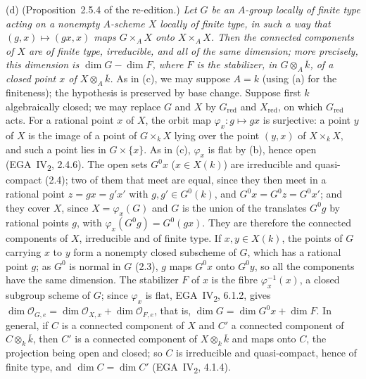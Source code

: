 \label{prop:sga3-VIA-2.5.4}%
(d) (Proposition~2.5.4 of the re-edition.) \emph{Let \(G\) be an \(A\)-group locally of finite type
acting on a nonempty \(A\)-scheme \(X\) locally of finite type, in such a way that
\((g,x)\mapsto(gx,x)\) maps \(G\times_AX\) onto \(X\times_AX\). Then the connected components of
\(X\) are of finite type, irreducible, and all of the same dimension;}
\label{concl:sga3-VIA-2.5.4-ii}%
\emph{more precisely, this dimension is \(\dim G-\dim F\), where \(F\) is the stabilizer, in
\(G\otimes_A\overline k\), of a closed point \(x\) of \(X\otimes_A\overline k\).} As in (c), we may
suppose \(A=k\) (using (a) for the finiteness); the hypothesis is preserved by base change. Suppose
first \(k\) algebraically closed; we may replace \(G\) and \(X\) by \(G_{\mathrm{red}}\) and
\(X_{\mathrm{red}}\), on which \(G_{\mathrm{red}}\) acts. For a rational point \(x\) of \(X\), the
orbit map \(\varphi_x\colon g\mapsto gx\) is surjective: a point \(y\) of \(X\) is the image of a
point of \(G\times_kX\) lying over the point \((y,x)\) of \(X\times_kX\), and such a point lies in
\(G\times\{x\}\). As in (c), \(\varphi_x\) is flat by (b), hence open
(EGA~IV\textsubscript{2}, 2.4.6). The open sets \(G^0x\) (\(x\in X(k)\)) are irreducible and
quasi-compact (2.4); two of them that meet are equal, since they then meet in a rational point
\(z=gx=g'x'\) with \(g,g'\in G^0(k)\), and \(G^0x=G^0z=G^0x'\); and they cover \(X\), since
\(X=\varphi_x(G)\) and \(G\) is the union of the translates \(G^0g\) by rational points \(g\), with
\(\varphi_x(G^0g)=G^0(gx)\). They are therefore the connected components of \(X\), irreducible and of
finite type. If \(x,y\in X(k)\), the points of \(G\) carrying \(x\) to \(y\) form a nonempty closed
subscheme of \(G\), which has a rational point \(g\); as \(G^0\) is normal in \(G\) (2.3), \(g\) maps
\(G^0x\) onto \(G^0y\), so all the components have the same dimension. The stabilizer \(F\) of \(x\)
is the fibre \(\varphi_x^{-1}(x)\), a closed subgroup scheme of \(G\); since \(\varphi_x\) is flat,
EGA~IV\textsubscript{2}, 6.1.2, gives
\(\dim\mathcal O_{G,e}=\dim\mathcal O_{X,x}+\dim\mathcal O_{F,e}\), that is,
\(\dim G=\dim G^0x+\dim F\). In general, if \(C\) is a connected component of \(X\) and \(C'\) a
connected component of \(C\otimes_k\overline k\), then \(C'\) is a connected component of
\(X\otimes_k\overline k\) and maps onto \(C\), the projection being open and closed; so \(C\) is
irreducible and quasi-compact, hence of finite type, and \(\dim C=\dim C'\)
(EGA~IV\textsubscript{2}, 4.1.4).
